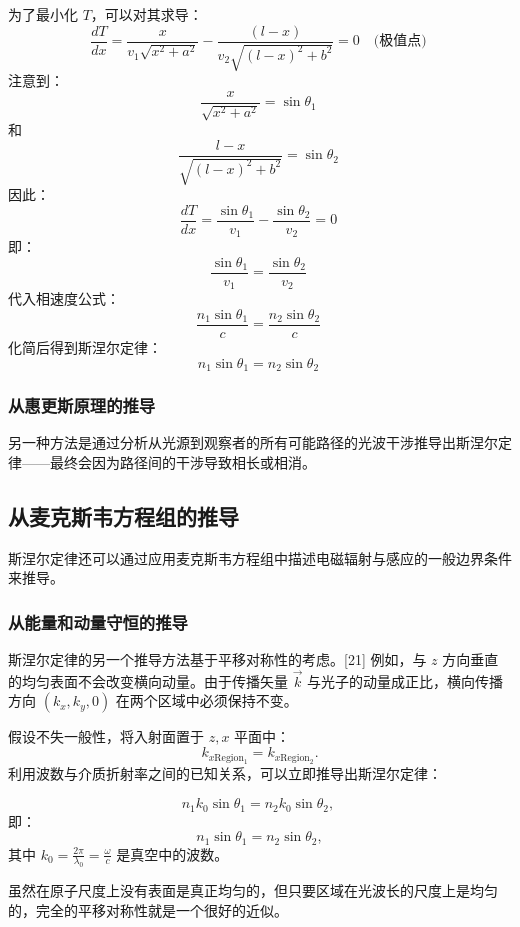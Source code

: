 为了最小化 \( T \)，可以对其求导：
\[
\frac{dT}{dx} = \frac{x}{v_1 \sqrt{x^2 + a^2}} - \frac{(l - x)}{v_2 \sqrt{(l - x)^2 + b^2}} = 0 \quad \text{(极值点)}~
\]
注意到：
\[
\frac{x}{\sqrt{x^2 + a^2}} = \sin \theta_1~
\]
和
\[
\frac{l - x}{\sqrt{(l - x)^2 + b^2}} = \sin \theta_2~
\]
因此：
\[
\frac{dT}{dx} = \frac{\sin \theta_1}{v_1} - \frac{\sin \theta_2}{v_2} = 0~
\]
即：
\[
\frac{\sin \theta_1}{v_1} = \frac{\sin \theta_2}{v_2}~
\]
代入相速度公式：
\[
\frac{n_1 \sin \theta_1}{c} = \frac{n_2 \sin \theta_2}{c}~
\]
化简后得到斯涅尔定律：
\[
n_1 \sin \theta_1 = n_2 \sin \theta_2~
\]
\subsubsection{从惠更斯原理的推导} 
另一种方法是通过分析从光源到观察者的所有可能路径的光波干涉推导出斯涅尔定律——最终会因为路径间的干涉导致相长或相消。  
\subsection{从麦克斯韦方程组的推导}  
斯涅尔定律还可以通过应用麦克斯韦方程组中描述电磁辐射与感应的一般边界条件来推导。
\subsubsection{从能量和动量守恒的推导}  
斯涅尔定律的另一个推导方法基于平移对称性的考虑。[21] 例如，与 \( z \) 方向垂直的均匀表面不会改变横向动量。由于传播矢量 \(\vec{k}\) 与光子的动量成正比，横向传播方向 \((k_x, k_y, 0)\) 在两个区域中必须保持不变。  

假设不失一般性，将入射面置于 \( z, x \) 平面中：  
\[
k_{x\text{Region}_1} = k_{x\text{Region}_2}.
\]  
利用波数与介质折射率之间的已知关系，可以立即推导出斯涅尔定律：  

\[
n_1 k_0 \sin \theta_1 = n_2 k_0 \sin \theta_2,~
\]  
即：  
\[
n_1 \sin \theta_1 = n_2 \sin \theta_2,
\]  
其中 \( k_0 = \frac{2\pi}{\lambda_0} = \frac{\omega}{c} \) 是真空中的波数。  

虽然在原子尺度上没有表面是真正均匀的，但只要区域在光波长的尺度上是均匀的，完全的平移对称性就是一个很好的近似。